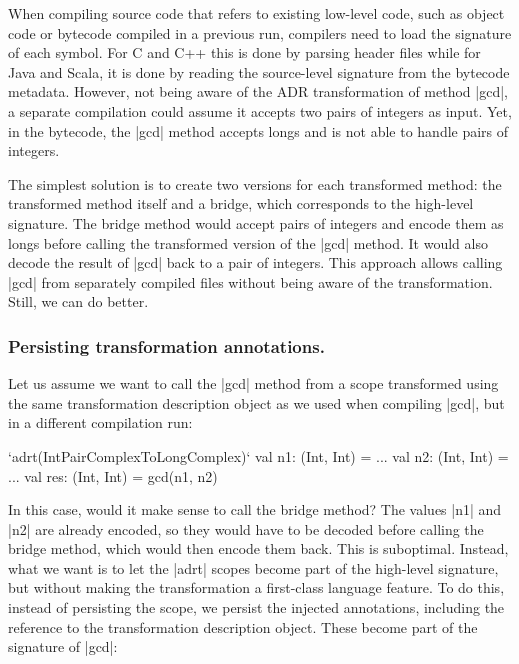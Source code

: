 When compiling source code that refers to existing low-level code, such as object code or bytecode compiled in a previous run, compilers need to load the signature of each symbol. For C and C++ this is done by parsing header files while for Java and Scala, it is done by reading the source-level signature from the bytecode metadata. However, not being aware of the ADR transformation of method |gcd|, a separate compilation could assume it accepts two pairs of integers as input. Yet, in the bytecode, the |gcd| method accepts longs and is not able to handle pairs of integers.

The simplest solution is to create two versions for each transformed method: the transformed method itself and a bridge, which corresponds to the high-level signature. The bridge method would accept pairs of integers and encode them as longs before calling the transformed version of the |gcd| method. It would also decode the result of |gcd| back to a pair of integers. This approach allows calling |gcd| from separately compiled files without being aware of the transformation. Still, we can do better.

\subsubsection{Persisting transformation annotations.} Let us assume we want to call the |gcd| method from a scope transformed using the same transformation description object as we used when compiling |gcd|, but in a different compilation run:

\begin{lstlisting-nobreak}
`adrt(IntPairComplexToLongComplex)` {
  val n1: (Int, Int) = ...
  val n2: (Int, Int) = ...
  val res: (Int, Int) = gcd(n1, n2)
}
\end{lstlisting-nobreak}

In this case, would it make sense to call the bridge method? The values |n1| and |n2| are already encoded, so they would have to be decoded before calling the bridge method, which would then encode them back. This is suboptimal. Instead, what we want is to let the |adrt| scopes become part of the high-level signature, but without making the transformation a first-class language feature. To do this, instead of persisting the scope, we persist the injected annotations, including the reference to the transformation description object. These become part of the signature of |gcd|: %

